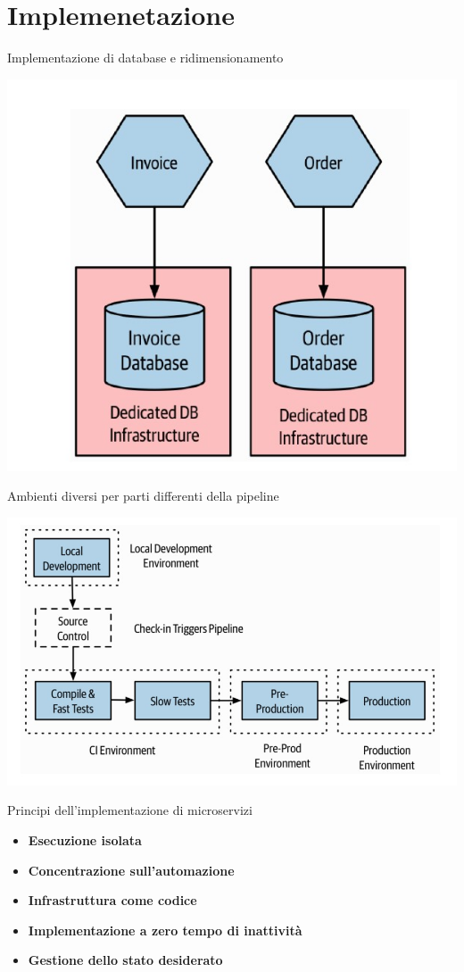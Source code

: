 \section{Implemenetazione}
Implementazione di database e ridimensionamento
\begin{center}
    \includegraphics[scale = 0.4]{Images/SOA/Deployment.jpg}
\end{center}

Ambienti diversi per parti differenti della pipeline
\begin{center}
    \includegraphics[scale = 0.4]{Images/SOA/Deployment2.jpg}
\end{center}
Principi dell'implementazione di microservizi
\begin{itemize}
    \item \textbf{Esecuzione isolata}
    \item \textbf{Concentrazione sull'automazione}
    \item \textbf{Infrastruttura come codice}
    \item \textbf{Implementazione a zero tempo di inattività}
    \item \textbf{Gestione dello stato desiderato}
\end{itemize}


